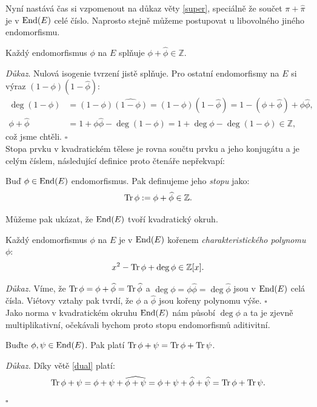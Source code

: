 \documentclass[12pt]{report}
\begin{document}
Nyní nastává čas si vzpomenout na důkaz věty \ref{super}, speciálně že součet $\pi+\widehat{\pi}$ je v $\operatorname{End}(E)$ celé číslo. Naprosto stejně můžeme postupovat u libovolného jiného endomorfismu.
\begin{veta}
Každý endomorfismus $\phi$ na $E$ splňuje $\phi+\widehat{\phi} \in \mathbb{Z}$.
\end{veta}
\noindent \textit{Důkaz}.  Nulová isogenie tvrzení jistě splňuje. Pro ostatní endomorfismy na $E$ si  výraz $(1 - \phi)(1 - \widehat{\phi})$:
\begin{align*}
\deg (1-\phi) &= (1-\phi)\widehat{(1-\phi)} = (1-\phi)(1-\widehat{\phi}) = 1-(\phi+\widehat{\phi})+\phi \widehat{\phi},\\
\phi+\widehat{\phi} &= 1 + \phi \widehat{\phi} - \deg (1-\phi) = 1 + \deg \phi - \deg (1-\phi) \in \mathbb{Z},
\end{align*}
což jsme chtěli. \hfill $\square$\\

Stopa prvku v kvadratickém tělese je rovna součtu prvku a jeho konjugátu a je celým číslem, následující definice proto čtenáře nepřekvapí:
\begin{definice}
Buď $\phi \in \operatorname{End}(E)$ endomorfismus. Pak definujeme jeho \textit{stopu} jako:
\begin{equation*}
\operatorname{Tr} \phi := \phi+\widehat{\phi} \in \mathbb{Z}.
\end{equation*}
\end{definice} 

Můžeme pak ukázat, že $\operatorname{End}(E)$ tvoří kvadratický okruh.
\begin{veta}
Každý endomorfismus $\phi$ na $E$ je v $\operatorname{End}(E)$ kořenem \textit{charakteristického polynomu} $\phi$:
\begin{equation*}
x^2 - \operatorname{Tr} \phi + \deg \phi \in \mathbb{Z}[x].
\end{equation*}
\end{veta}
\noindent \textit{Důkaz.} Víme, že $\operatorname{Tr} \phi = \phi+ \widehat{\phi} = \operatorname{Tr} \widehat{\phi}$ a $\deg \phi = \phi \widehat{\phi} = \deg \widehat{\phi}$ jsou v $\operatorname{End}(E)$ celá čísla. Viétovy vztahy pak tvrdí, že $\phi$ a $\widehat{\phi}$ jsou kořeny polynomu výše. \hfill $\square$\\

Jako norma v kvadratickém okruhu $\operatorname{End}(E)$ nám působí $\deg \phi$ a ta je zjevně multiplikativní, očekávali bychom proto stopu endomorfismů aditivitní.

\begin{lemma}
Buďte $\phi, \psi \in \operatorname{End}(E)$. Pak platí $\operatorname{Tr} \phi+\psi = \operatorname{Tr} \phi + \operatorname{Tr} \psi$.
\end{lemma}
\noindent \textit{Důkaz.} Díky větě \ref{dual} platí:
\begin{equation*}
\operatorname{Tr}  \phi+\psi = \phi+\psi+\widehat{\phi+\psi} = \phi+\psi+\widehat{\phi}+\widehat{\psi} = \operatorname{Tr} \phi + \operatorname{Tr} \psi.
\end{equation*}
\hfill $\square$\\
\end{document}
